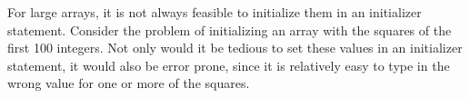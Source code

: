 




For large arrays, it is not always feasible to initialize them in an
initializer statement.  Consider the problem of initializing an array
with the squares of the first 100 integers.  Not only would it be
tedious to set these values in an initializer statement, it would also
be error prone, since it is relatively easy to type in the wrong value
for one or more of the squares.


